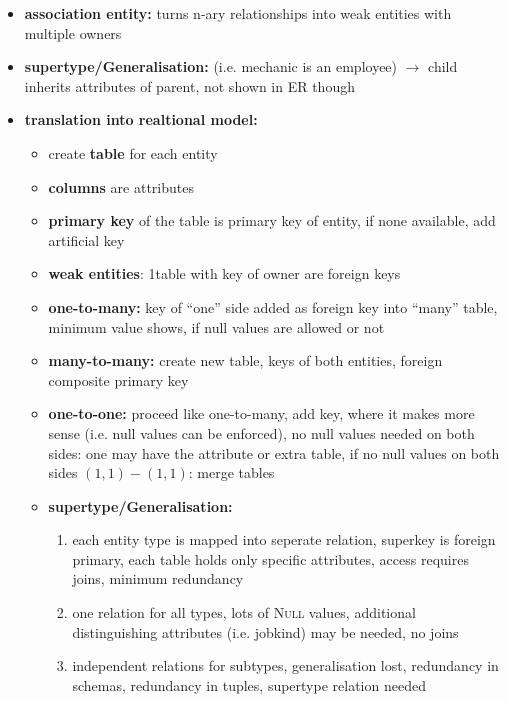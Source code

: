 \documentclass{scrartcl}
\begin{document}
\begin{itemize}
	\item \textbf{association entity:} turns n-ary relationships into weak entities with multiple owners
	\item \textbf{supertype/Generalisation:} (i.e. mechanic is an employee) $\to$ child inherits attributes of parent, not shown in ER though
	\item \textbf{translation into realtional model:}
	\begin{itemize}
		\item create \textbf{table} for each entity
		\item \textbf{columns} are attributes
		\item \textbf{primary key} of the table is primary key of entity, if none available, add artificial key
		\item \textbf{weak entities}: 1table with key of owner are foreign keys
		\item \textbf{one-to-many:} key of "`one"' side added as foreign key into "`many"' table, minimum value shows, if null values are allowed or not
		\item \textbf{many-to-many:} create new table, keys of both entities, foreign composite primary key
		\item \textbf{one-to-one:} proceed like one-to-many, add key, where it makes more sense (i.e. null values can be enforced), no null values needed on both sides: one may have the attribute or extra table, if no null values on both sides $(1,1)-(1,1)$: merge tables
		\item \textbf{supertype/Generalisation:}
		\begin{enumerate}
			\item each entity type is mapped into seperate relation, superkey is foreign primary, each table holds only specific attributes, access requires joins, minimum redundancy
			\item one relation for all types, lots of \textsc{Null} values, additional distinguishing attributes (i.e. jobkind) may be needed, no joins
			\item independent relations for subtypes, generalisation lost, redundancy in schemas, redundancy in tuples, supertype relation needed
		\end{enumerate}
	\end{itemize}
\end{itemize}
\end{document}
